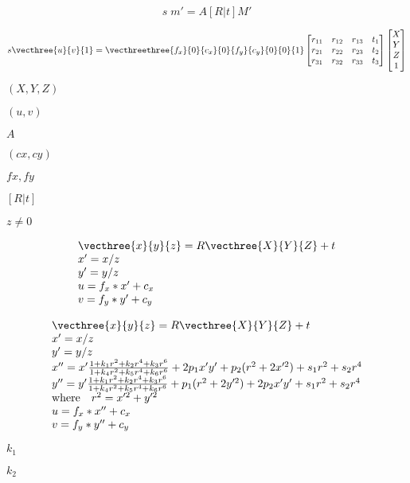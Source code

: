 \documentclass{article}
\begin{document}
\[s  \; m' = A [R|t] M'\]
\pagebreak

\[s  \vecthree{u}{v}{1} = \vecthreethree{f_x}{0}{c_x}{0}{f_y}{c_y}{0}{0}{1}
\begin{bmatrix}
r_{11} & r_{12} & r_{13} & t_1  \\
r_{21} & r_{22} & r_{23} & t_2  \\
r_{31} & r_{32} & r_{33} & t_3
\end{bmatrix}
\begin{bmatrix}
X \\
Y \\
Z \\
1
\end{bmatrix}\]
\pagebreak

$(X, Y, Z)$
\pagebreak

$(u, v)$
\pagebreak

$A$
\pagebreak

$(cx, cy)$
\pagebreak

$fx, fy$
\pagebreak

$[R|t]$
\pagebreak

$z \ne 0$
\pagebreak

\[\begin{array}{l}
\vecthree{x}{y}{z} = R  \vecthree{X}{Y}{Z} + t \\
x' = x/z \\
y' = y/z \\
u = f_x*x' + c_x \\
v = f_y*y' + c_y
\end{array}\]
\pagebreak

\[\begin{array}{l} \vecthree{x}{y}{z} = R  \vecthree{X}{Y}{Z} + t \\ x' = x/z \\ y' = y/z \\ x'' = x'  \frac{1 + k_1 r^2 + k_2 r^4 + k_3 r^6}{1 + k_4 r^2 + k_5 r^4 + k_6 r^6} + 2 p_1 x' y' + p_2(r^2 + 2 x'^2) + s_1 r^2 + s_2 r^4 \\ y'' = y'  \frac{1 + k_1 r^2 + k_2 r^4 + k_3 r^6}{1 + k_4 r^2 + k_5 r^4 + k_6 r^6} + p_1 (r^2 + 2 y'^2) + 2 p_2 x' y' + s_1 r^2 + s_2 r^4 \\ \text{where} \quad r^2 = x'^2 + y'^2  \\ u = f_x*x'' + c_x \\ v = f_y*y'' + c_y \end{array}\]
\pagebreak

$k_1$
\pagebreak

$k_2$
\pagebreak
\end{document}
